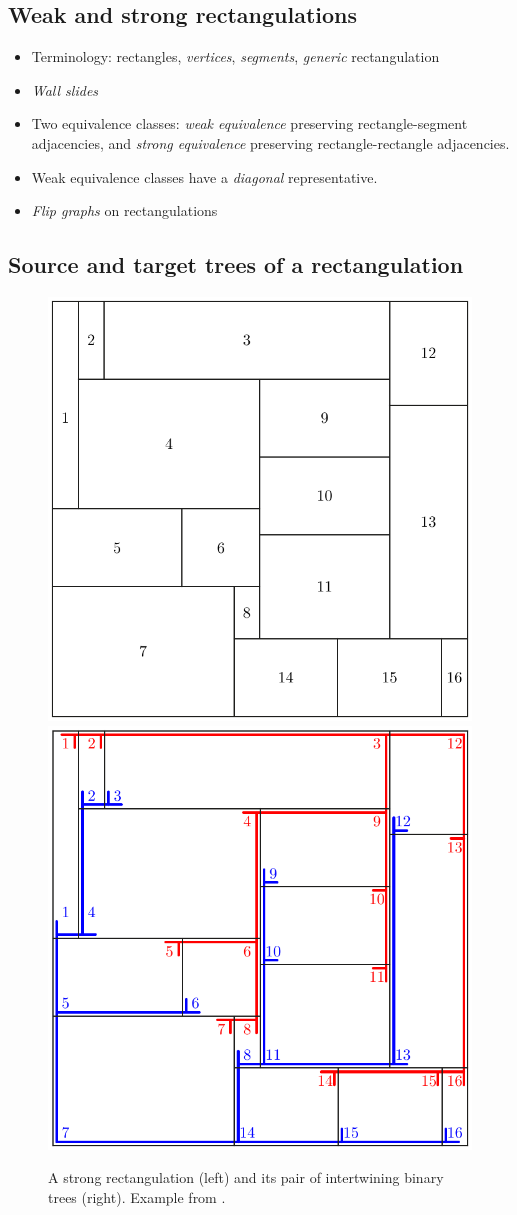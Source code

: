 \documentclass{amsart}
\theoremstyle{definition}
\newcommand{\darkblue}{\color{darkblue}} %
\newcommand{\defn}[1]{\textsl{\darkblue #1}} %
\begin{document}
\subsection{Weak and strong rectangulations}

\begin{itemize}
\item Terminology: rectangles, \defn{vertices}, \defn{segments}, \defn{generic} rectangulation
\item \defn{Wall slides}
\item Two equivalence classes: \defn{weak equivalence} preserving rectangle-segment adjacencies, and \defn{strong equivalence} preserving rectangle-rectangle adjacencies.
\item Weak equivalence classes have a \defn{diagonal} representative.
\item \defn{Flip graphs} on rectangulations
\end{itemize}


\subsection{Source and target trees of a rectangulation}
\label{subsec:sourceTargetTrees}


\begin{figure}
	\centerline{\includegraphics[width=.5\textwidth]{strongRectangulation} \qquad \includegraphics[width=.5\textwidth]{strongRectangulationTrees}}
	\caption{\label{fig:sourceTargetTrees}A strong rectangulation (left) and its pair of intertwining binary trees (right). Example from \cite{ACFF24}.}
\end{figure}
\end{document}
